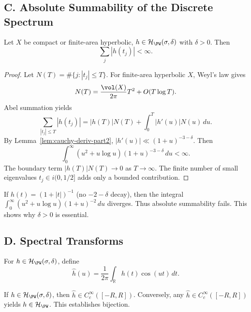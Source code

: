 
\subsection*{C. Absolute Summability of the Discrete Spectrum}
\label{subsec:absolute-sum-part2}

\begin{proposition}
\label{prop:absolute-sum-part2}
Let $X$ be compact or finite-area hyperbolic, $h\in\mathcal H_{\PW}(\sigma,\delta)$ with $\delta>0$. Then
\[
  \sum_j |h(t_j)|<\infty.
\]
\end{proposition}

\begin{proof}
Let $N(T)=\#\{j:|t_j|\le T\}$. For finite-area hyperbolic $X$, Weyl’s law gives
\[
  N(T)=\frac{\vol(X)}{2\pi}T^2+O(T\log T).
\]
Abel summation yields
\[
  \sum_{|t_j|\le T}|h(t_j)|=|h(T)|N(T)+\int_0^T |h'(u)|N(u)\,du.
\]
By Lemma~\ref{lem:cauchy-deriv-part2}, $|h'(u)|\ll (1+u)^{-3-\delta}$. Then
\[
  \int_0^\infty (u^2+u\log u)(1+u)^{-3-\delta}\,du<\infty.
\]
The boundary term $|h(T)|N(T)\to0$ as $T\to\infty$. The finite number of small eigenvalues $t_j\in i(0,1/2]$ adds only a bounded contribution.
\end{proof}

\begin{counterexample}
If $h(t)=(1+|t|)^{-1}$ (no $-2-\delta$ decay), then the integral $\int_0^\infty (u^2+u\log u)(1+u)^{-2}\,du$ diverges. Thus absolute summability fails. This shows why $\delta>0$ is essential.
\end{counterexample}


\subsection*{D. Spectral Transforms}
\label{subsec:spectral-transforms-part2}

\begin{definition}
\label{def:hc-transform-part2}
For $h\in \mathcal H_{\PW}(\sigma,\delta)$, define
\[
  \hat h(u)=\frac{1}{2\pi}\int_{\mathbb R} h(t)\cos(ut)\,dt.
\]
\end{definition}

\begin{lemma}[Properties]
\label{lem:hc-properties-part2}
If $h\in \mathcal H_{\PW}(\sigma,\delta)$, then $\hat h\in C_c^\infty([-R,R])$. Conversely, any $\hat h\in C_c^\infty([-R,R])$ yields $h\in \mathcal H_{\PW}$. This establishes bijection.
\end{lemma}


